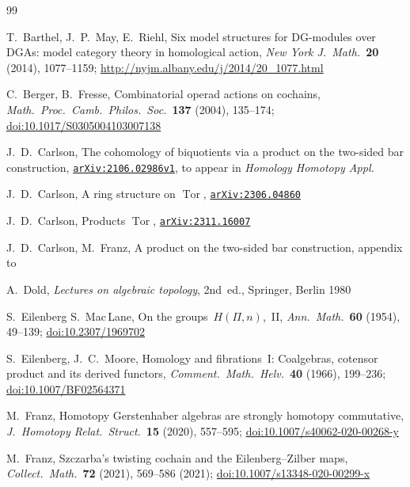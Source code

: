 \documentclass[letterpaper]{amsart}
\def\arxiv#1{\href{http://arxiv.org/abs/#1}{\texttt{arXiv:#1}}}
\def\doi#1{\href{http://doi.org/#1}{doi:#1}}
\numberwithin{equation}{section}
\theoremstyle{plain}
\theoremstyle{definition}
\theoremstyle{remark}
\DeclareMathOperator{\Tor}{Tor}
\begin{document}
\begin{thebibliography}{99}

T.~Barthel, J.~P.~May, E.~Riehl,
\newblock Six model structures for DG-modules over DGAs: model category theory in homological action,
\newblock \textit{New York J.\ Math.}~\textbf{20} (2014), 1077--1159;
\newblock \url{http://nyjm.albany.edu/j/2014/20_1077.html}

C.~Berger, B.~Fresse,
\newblock Combinatorial operad actions on cochains,
\newblock \textit{Math.\ Proc.\ Camb.\ Philos.\ Soc.}~\textbf{137} (2004), 135--174;
\newblock \doi{10.1017/S0305004103007138}

J.~D.~Carlson,
\newblock The cohomology of biquotients via a product on the two-sided bar construction,
\newblock \arxiv{2106.02986v1}, to appear in \textit{Homology Homotopy Appl.}

J.~D.~Carlson,
\newblock A ring structure on $\Tor$,
\newblock \arxiv{2306.04860}

J.~D.~Carlson,
\newblock Products $\Tor$,
\newblock \arxiv{2311.16007}

J.~D.~Carlson, M.~Franz,
\newblock A product on the two-sided bar construction,
\newblock appendix to \cite{Carlson:biquot}

A.~Dold,
\newblock \textit{Lectures on algebraic topology},
\newblock 2nd~ed., %
\newblock Springer, Berlin 1980

S.~Eilenberg S.~Mac\,Lane,
\newblock On the groups~$H(\Pi,n)$,~II,
\newblock \textit{Ann.\ Math.}~\textbf{60} (1954), 49--139;
\newblock \doi{10.2307/1969702}

S.~Eilenberg, J.~C.~Moore,
\newblock Homology and fibrations~I: Coalgebras, cotensor product and its derived functors,
\newblock \textit{Comment.\ Math.\ Helv.}~\textbf{40} (1966), 199--236;
\newblock \doi{10.1007/BF02564371}  

M.~Franz,
\newblock Homotopy Gerstenhaber algebras are strongly homotopy commutative,
\newblock \textit{J.\ Homotopy Relat.\ Struct.}~\textbf{15} (2020), 557--595;
\newblock \doi{10.1007/s40062-020-00268-y}

M.~Franz,
\newblock Szczarba's twisting cochain and the Eilenberg--Zilber maps,
\newblock \textit{Collect.\ Math.}~\textbf{72} (2021), 569--586 (2021);
\newblock \doi{10.1007/s13348-020-00299-x}


\end{thebibliography}
\end{document}

